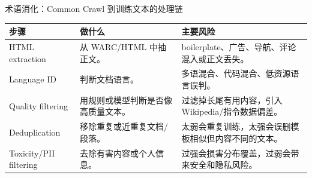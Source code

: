 \begin{knowledgebox}{术语消化：Common Crawl 到训练文本的处理链}
\begin{tabular}{L{0.22\textwidth}L{0.34\textwidth}L{0.34\textwidth}}
\toprule
步骤 & 做什么 & 主要风险 \\
\midrule
HTML extraction & 从 WARC/HTML 中抽正文。 & boilerplate、广告、导航、评论混入或正文丢失。 \\
Language ID & 判断文档语言。 & 多语混合、代码混合、低资源语言误判。 \\
Quality filtering & 用规则或模型判断是否像高质量文本。 & 过滤掉长尾有用内容，引入 Wikipedia/指令数据偏差。 \\
Deduplication & 移除重复或近重复文档/段落。 & 太弱会重复训练，太强会误删模板相似但内容不同的文本。 \\
Toxicity/PII filtering & 去除有害内容或个人信息。 & 过强会损害分布覆盖，过弱会带来安全和隐私风险。 \\
\bottomrule
\end{tabular}
\end{knowledgebox}

